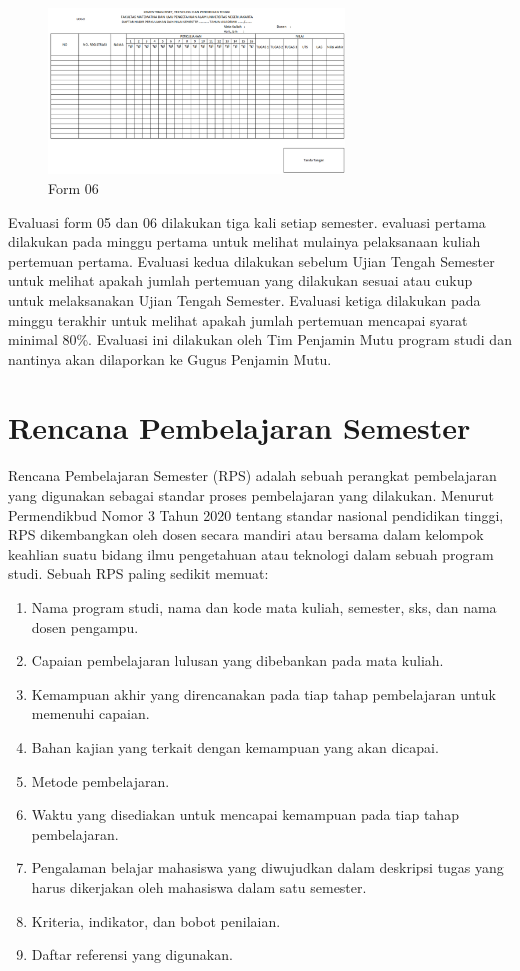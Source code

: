 \begin{figure}[h!]
	\centering
	\includegraphics[width=0.7\textwidth]{gambar/form06-gambaran}
	\caption{Form 06}
\end{figure}

	Evaluasi form 05 dan 06 dilakukan tiga kali setiap semester. evaluasi pertama dilakukan pada minggu pertama untuk melihat mulainya pelaksanaan kuliah pertemuan pertama. Evaluasi kedua dilakukan sebelum Ujian Tengah Semester untuk melihat apakah jumlah pertemuan yang dilakukan sesuai atau cukup untuk melaksanakan Ujian Tengah Semester. Evaluasi ketiga dilakukan pada minggu terakhir untuk melihat apakah jumlah pertemuan mencapai syarat minimal 80\%. Evaluasi ini dilakukan oleh Tim Penjamin Mutu program studi dan nantinya akan dilaporkan ke Gugus Penjamin Mutu.

\section{Rencana Pembelajaran Semester}

	Rencana Pembelajaran Semester (RPS) adalah sebuah perangkat pembelajaran yang digunakan sebagai standar proses pembelajaran yang dilakukan. Menurut Permendikbud Nomor 3 Tahun 2020 tentang standar nasional pendidikan tinggi, RPS dikembangkan oleh dosen secara mandiri atau bersama dalam kelompok keahlian suatu bidang ilmu pengetahuan atau teknologi dalam sebuah program studi. Sebuah RPS paling sedikit memuat: \citep{Kemendikbud2020}

\begin{enumerate}
	\item Nama program studi, nama dan kode mata kuliah, semester, sks, dan nama dosen pengampu.
	\item Capaian pembelajaran lulusan yang dibebankan pada mata kuliah.
	\item Kemampuan akhir yang direncanakan pada tiap tahap pembelajaran untuk memenuhi capaian.
	\item Bahan kajian yang terkait dengan kemampuan yang akan dicapai.
	\item Metode pembelajaran.
	\item Waktu yang disediakan untuk mencapai kemampuan pada tiap tahap pembelajaran.
	\item Pengalaman belajar mahasiswa yang diwujudkan dalam deskripsi tugas yang harus dikerjakan oleh mahasiswa dalam satu semester.
	\item Kriteria, indikator, dan bobot penilaian.
	\item Daftar referensi yang digunakan.
\end{enumerate}

